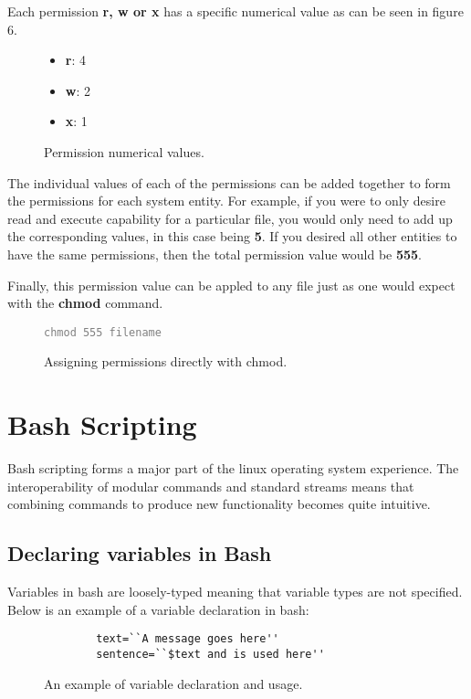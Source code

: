 \documentclass{article}
\begin{document}
Each permission \textbf{r, w or x} has a specific numerical value as can be seen in figure 6.\cite{permValues}

\begin{figure}[h]
  \label{perms3}
  \begin{itemize}
    \item \textbf{r}: 4
    \item \textbf{w}: 2
    \item \textbf{x}: 1
  \end{itemize}
  \caption{Permission numerical values.}
\end{figure}

The individual values of each of the permissions can be added together to form the permissions for each system entity. For example,
if you were to only desire read and execute capability for a particular file, you would only need to add up the corresponding values,
in this case being \textbf{5}. If you desired all other entities to have the same permissions, then the total permission value would be \textbf{555}.

Finally, this permission value can be appled to any file just as one would expect with the \textbf{chmod} command.

\begin{figure}[h]
  \label{perms4}
  \textcolor{grey}{
    \texttt{chmod 555 filename}
  }
  \caption{Assigning permissions directly with chmod.}
\end{figure}

\section{Bash Scripting}
Bash scripting forms a major part of the linux operating system experience. The interoperability of modular commands and standard streams means
that combining commands to produce new functionality becomes quite intuitive.

\subsection{Declaring variables in Bash}

Variables in bash are loosely-typed meaning that variable types are not
specified. Below is an example of a variable declaration in bash:

\begin{figure}[h]
  \label{bash1}
    \lstset{language=Bash}
    \begin{lstlisting}
        text=``A message goes here''
        sentence=``$text and is used here''

    \end{lstlisting}
    \caption{An example of variable declaration and usage.}
\end{figure}
\end{document}
